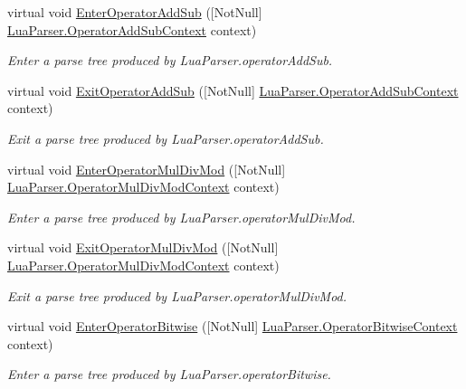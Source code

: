 \begin{DoxyCompactItemize}
virtual void \mbox{\hyperlink{classzlua_1_1_lua_base_listener_ac3bb5e4809651278e44d46bc5ca3c7b1}{Enter\+Operator\+Add\+Sub}} (\mbox{[}Not\+Null\mbox{]} \mbox{\hyperlink{classzlua_1_1_lua_parser_1_1_operator_add_sub_context}{Lua\+Parser.\+Operator\+Add\+Sub\+Context}} context)
\begin{DoxyCompactList}\small\item\em Enter a parse tree produced by Lua\+Parser.\+operator\+Add\+Sub. \end{DoxyCompactList}\item 
virtual void \mbox{\hyperlink{classzlua_1_1_lua_base_listener_aa8686e94c0d6dbf3292a7ed77baa54b5}{Exit\+Operator\+Add\+Sub}} (\mbox{[}Not\+Null\mbox{]} \mbox{\hyperlink{classzlua_1_1_lua_parser_1_1_operator_add_sub_context}{Lua\+Parser.\+Operator\+Add\+Sub\+Context}} context)
\begin{DoxyCompactList}\small\item\em Exit a parse tree produced by Lua\+Parser.\+operator\+Add\+Sub. \end{DoxyCompactList}\item 
virtual void \mbox{\hyperlink{classzlua_1_1_lua_base_listener_a4a1422260529c79e0e43d89652182159}{Enter\+Operator\+Mul\+Div\+Mod}} (\mbox{[}Not\+Null\mbox{]} \mbox{\hyperlink{classzlua_1_1_lua_parser_1_1_operator_mul_div_mod_context}{Lua\+Parser.\+Operator\+Mul\+Div\+Mod\+Context}} context)
\begin{DoxyCompactList}\small\item\em Enter a parse tree produced by Lua\+Parser.\+operator\+Mul\+Div\+Mod. \end{DoxyCompactList}\item 
virtual void \mbox{\hyperlink{classzlua_1_1_lua_base_listener_a686c3f75fd31a0b4c7cae3f3b99cd2aa}{Exit\+Operator\+Mul\+Div\+Mod}} (\mbox{[}Not\+Null\mbox{]} \mbox{\hyperlink{classzlua_1_1_lua_parser_1_1_operator_mul_div_mod_context}{Lua\+Parser.\+Operator\+Mul\+Div\+Mod\+Context}} context)
\begin{DoxyCompactList}\small\item\em Exit a parse tree produced by Lua\+Parser.\+operator\+Mul\+Div\+Mod. \end{DoxyCompactList}\item 
virtual void \mbox{\hyperlink{classzlua_1_1_lua_base_listener_af4009c58d1272593e9d8a18b8e306591}{Enter\+Operator\+Bitwise}} (\mbox{[}Not\+Null\mbox{]} \mbox{\hyperlink{classzlua_1_1_lua_parser_1_1_operator_bitwise_context}{Lua\+Parser.\+Operator\+Bitwise\+Context}} context)
\begin{DoxyCompactList}\small\item\em Enter a parse tree produced by Lua\+Parser.\+operator\+Bitwise. \end{DoxyCompactList}\item 

\end{DoxyCompactItemize}
